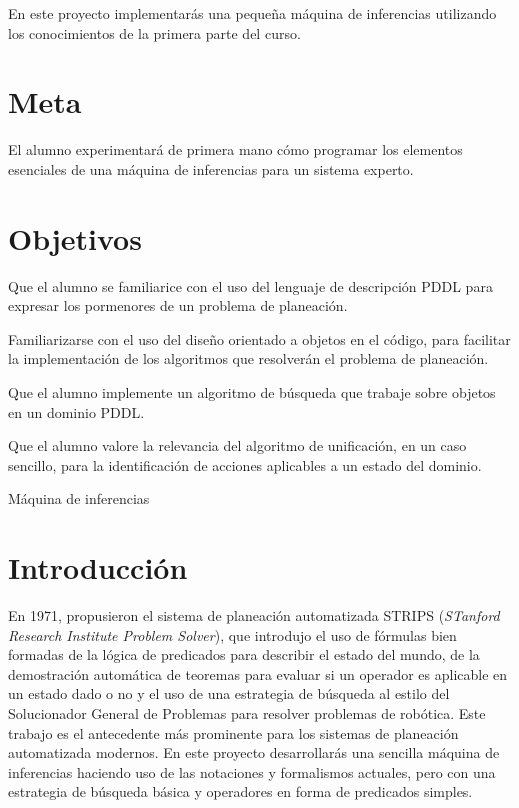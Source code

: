 
En este proyecto implementarás una pequeña máquina de inferencias utilizando los conocimientos de la primera parte del curso.

\section{Meta}

El alumno experimentará de primera mano cómo programar los elementos esenciales de una máquina de inferencias para un sistema experto.

\section{Objetivos}

\begin{compactitem}
 \item Que el alumno se familiarice con el uso del lenguaje de descripción PDDL para expresar
       los pormenores de un problema de planeación.
 \item Familiarizarse con el uso del diseño orientado a objetos en el código, para facilitar
       la implementación de los algoritmos que resolverán el problema de planeación.
 \item Que el alumno implemente un algoritmo de búsqueda que trabaje sobre objetos en un
       dominio PDDL.
 \item Que el alumno valore la relevancia del algoritmo de unificación, en un caso sencillo,
       para la identificación de acciones aplicables a un estado del dominio.
\end{compactitem}


\begin{auxcode}
 \caption{Máquina de inferencias}
 \centering
\end{auxcode}


\section{Introducción}

En 1971, \cite{Fikes1971} propusieron el sistema de planeación automatizada STRIPS (\textit{STanford Research Institute Problem Solver}), que introdujo el uso de fórmulas bien formadas de la lógica de predicados para describir el estado del mundo, de la demostración automática de teoremas para evaluar si un operador es aplicable en un estado dado o no y el uso de una estrategia de búsqueda al estilo del Solucionador General de Problemas para resolver problemas de robótica.  Este trabajo es el antecedente más prominente para los sistemas de planeación automatizada modernos.  En este proyecto desarrollarás una sencilla máquina de inferencias haciendo uso de las notaciones y formalismos actuales, pero con una estrategia de búsqueda básica y operadores en forma de predicados simples.


